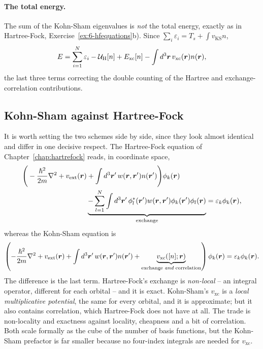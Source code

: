 \paragraph{The total energy.}
The sum of the Kohn-Sham eigenvalues is \emph{not} the total energy, exactly
as in Hartree-Fock, Exercise~\ref{ex:6-hfequations}b).  Since
$\sum_i\varepsilon_i = T_s + \int v_{\mathrm{KS}}n$,
\begin{equation}
  E = \sum_{i=1}^{N}\varepsilon_i
    - \mathcal{U}_{\mathrm{H}}[n]
    + E_{\mathrm{xc}}[n]
    - \int d^3\bm{r}\,v_{\mathrm{xc}}(\bm{r})n(\bm{r}) ,
  \label{eq:8-kstotalenergy}
\end{equation}
the last three terms correcting the double counting of the Hartree and
exchange-correlation contributions.

\subsection{Kohn-Sham against Hartree-Fock}
\label{sec:ksvshf}

It is worth setting the two schemes side by side, since they look almost
identical and differ in one decisive respect.  The Hartree-Fock equation of
Chapter~\ref{chap:hartrefock} reads, in coordinate space,
\begin{align}
  \Bigg(-\frac{\hslash^2}{2m}\nabla^2 + v_{\mathrm{ext}}(\bm{r})
   &+ \int d^3\bm{r}'\,w(\bm{r},\bm{r}')n(\bm{r}')\Bigg)\phi_k(\bm{r})
   \nonumber\\
   &\underbrace{-\sum_{l=1}^{N}\int d^3\bm{r}'\,
     \phi^{*}_l(\bm{r}')w(\bm{r},\bm{r}')\phi_k(\bm{r}')\phi_l(\bm{r})}
     _{\text{exchange}}
   = \varepsilon_k\phi_k(\bm{r}),
  \label{eq:8-hfcoordinate}
\end{align}
whereas the Kohn-Sham equation is
\begin{equation}
  \left(-\frac{\hslash^2}{2m}\nabla^2 + v_{\mathrm{ext}}(\bm{r})
    + \int d^3\bm{r}'\,w(\bm{r},\bm{r}')n(\bm{r}')
    + \underbrace{v_{\mathrm{xc}}([n];\bm{r})}
      _{\text{exchange {\it and} correlation}}\right)\phi_k(\bm{r})
   = \varepsilon_k\phi_k(\bm{r}).
  \label{eq:8-kscoordinate}
\end{equation}
The difference is the last term.  Hartree-Fock's exchange is \emph{non-local}
-- an integral operator, different for each orbital -- and it is exact.
Kohn-Sham's $v_{\mathrm{xc}}$ is a \emph{local multiplicative potential}, the
same for every orbital, and it is approximate; but it also contains
correlation, which Hartree-Fock does not have at all.  The trade is
non-locality and exactness against locality, cheapness and a bit of
correlation.  Both scale formally as the cube of the number of basis
functions, but the Kohn-Sham prefactor is far smaller because no
four-index integrals are needed for $v_{\mathrm{xc}}$.

